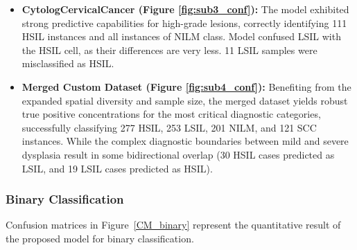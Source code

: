 \documentclass[pdflatex,sn-nature]{sn-jnl}%
\theoremstyle{thmstyleone}%
\theoremstyle{thmstyletwo}%
\theoremstyle{thmstylethree}%
\begin{document}
\begin{itemize}
\item \textbf{CytologCervicalCancer (Figure \ref{fig:sub3_conf}):} The model exhibited strong predictive capabilities for high-grade lesions, correctly identifying 111 HSIL instances and all instances of NILM class. Model confused LSIL with the HSIL cell, as their differences are very less. 11 LSIL samples were misclassified as HSIL.

\item \textbf{Merged Custom Dataset (Figure \ref{fig:sub4_conf}):} Benefiting from the expanded spatial diversity and sample size, the merged dataset yields robust true positive concentrations for the most critical diagnostic categories, successfully classifying 277 HSIL, 253 LSIL, 201 NILM, and 121 SCC instances. While the complex diagnostic boundaries between mild and severe dysplasia result in some bidirectional overlap (30 HSIL cases predicted as LSIL, and 19 LSIL cases predicted as HSIL). \\

\end{itemize}
 

\subsubsection{Binary Classification}

Confusion matrices in Figure~\ref{CM_binary} represent the quantitative result of the proposed model for binary classification. 
\end{document}
